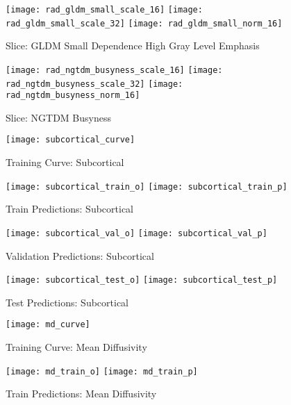 
\begin{figure}[H]
\centering
\texttt{[image: rad\_gldm\_small\_scale\_16]}
\texttt{[image: rad\_gldm\_small\_scale\_32]}
\texttt{[image: rad\_gldm\_small\_norm\_16]}
\caption{Slice: GLDM Small Dependence High Gray Level Emphasis}
\label{fig:gls}
\end{figure}

\begin{figure}[H]
\centering
\texttt{[image: rad\_ngtdm\_busyness\_scale\_16]}
\texttt{[image: rad\_ngtdm\_busyness\_scale\_32]}
\texttt{[image: rad\_ngtdm\_busyness\_norm\_16]}
\caption{Slice: NGTDM Busyness}
\label{fig:ngb}
\end{figure}

\begin{figure}[H]
\centering
\texttt{[image: subcortical\_curve]}
\caption{Training Curve: Subcortical}
\label{fig:curve-sub}
\end{figure}

\begin{figure}[H]
\centering
\texttt{[image: subcortical\_train\_o]}
\texttt{[image: subcortical\_train\_p]}
\caption{Train Predictions: Subcortical}
\label{fig:pred-tra-sub}
\end{figure}

\begin{figure}[H]
\centering
\texttt{[image: subcortical\_val\_o]}
\texttt{[image: subcortical\_val\_p]}
\caption{Validation Predictions: Subcortical}
\label{fig:pred-val-sub}
\end{figure}

\begin{figure}[H]
\centering
\texttt{[image: subcortical\_test\_o]}
\texttt{[image: subcortical\_test\_p]}
\caption{Test Predictions: Subcortical}
\label{fig:pred-tes-sub}
\end{figure}

\begin{figure}[H]
\centering
\texttt{[image: md\_curve]}
\caption{Training Curve: Mean Diffusivity}
\label{fig:curve-md}
\end{figure}

\begin{figure}[H]
\centering
\texttt{[image: md\_train\_o]}
\texttt{[image: md\_train\_p]}
\caption{Train Predictions: Mean Diffusivity}
\label{fig:pred-tra-md}
\end{figure}

